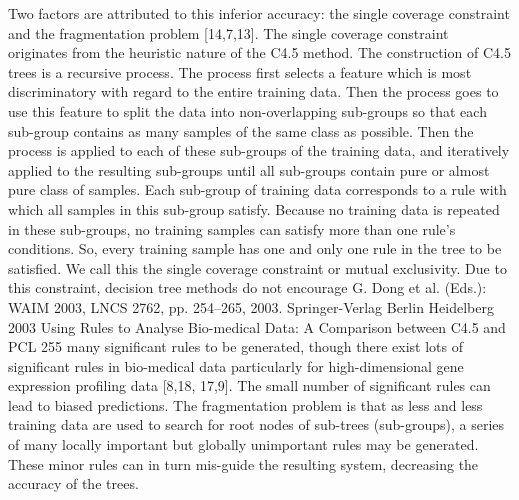 Two factors are attributed
to this inferior accuracy: the single coverage constraint and the fragmentation problem
[14,7,13].
The single coverage constraint originates from the heuristic nature of the C4.5
method. The construction of C4.5 trees is a recursive process. The process first selects
a feature which is most discriminatory with regard to the entire training data. Then
the process goes to use this feature to split the data into non-overlapping sub-groups
so that each sub-group contains as many samples of the same class as possible. Then
the process is applied to each of these sub-groups of the training data, and iteratively
applied to the resulting sub-groups until all sub-groups contain pure or almost pure class
of samples.
Each sub-group of training data corresponds to a rule with which all samples in this
sub-group satisfy. Because no training data is repeated in these sub-groups, no training
samples can satisfy more than one rule’s conditions. So, every training sample has one
and only one rule in the tree to be satisfied. We call this the single coverage constraint
or mutual exclusivity. Due to this constraint, decision tree methods do not encourage
G. Dong et al. (Eds.): WAIM 2003, LNCS 2762, pp. 254–265, 2003. Springer-Verlag Berlin Heidelberg 2003
Using Rules to Analyse Bio-medical Data: A Comparison between C4.5 and PCL 255
many significant rules to be generated, though there exist lots of significant rules in
bio-medical data particularly for high-dimensional gene expression profiling data [8,18,
17,9]. The small number of significant rules can lead to biased predictions.
The fragmentation problem is that as less and less training data are used to search for
root nodes of sub-trees (sub-groups), a series of many locally important but globally unimportant
rules may be generated. These minor rules can in turn mis-guide the resulting
system, decreasing the accuracy of the trees.
